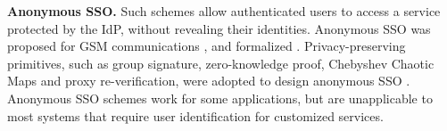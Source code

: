 %

\noindent\textbf{Anonymous SSO.}
Such schemes allow authenticated users to access a service protected by the IdP,
    without revealing their identities.
Anonymous SSO was proposed for GSM communications \cite{ElmuftiWRR08},
    and formalized \cite{WangWS13}.
Privacy-preserving primitives, such as group signature, zero-knowledge proof, Chebyshev Chaotic Maps and proxy re-verification,
     were adopted to design anonymous SSO \cite{WangWS13,HanCSTW18,Lee18,HanCSTWW20}.
Anonymous SSO schemes work for some applications,
    but are unapplicable to most systems that require user identification for customized services.

